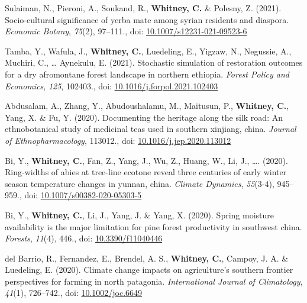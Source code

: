 \documentclass[11pt,a4paper,]{awesome-cv}
\newlength{\cslhangindent}
\newenvironment{CSLReferences}[2] %
 {\begin{list}{}{%
  \setlength{\itemindent}{0pt}
  \setlength{\leftmargin}{0pt}
  \setlength{\parsep}{0pt}
  \ifodd #1
   \setlength{\leftmargin}{\cslhangindent}
   \setlength{\itemindent}{-1\cslhangindent}
  \fi
  \setlength{\itemsep}{#2\baselineskip}}}
 {\end{list}}
\begin{document}
\begin{CSLReferences}{1}{0}
Sulaiman, N., Pieroni, A., Soukand, R., \textbf{Whitney, C.} \& Polesny,
Z. (2021). Socio-cultural significance of yerba mate among syrian
residents and diaspora. \emph{Economic Botany}, \emph{75}(2), 97--111.,
doi:
\href{https://doi.org/10.1007/s12231-021-09523-6}{10.1007/s12231-021-09523-6}

Tamba, Y., Wafula, J., \textbf{Whitney, C.}, Luedeling, E., Yigzaw, N.,
Negussie, A., Muchiri, C., \ldots{} Aynekulu, E. (2021). Stochastic
simulation of restoration outcomes for a dry afromontane forest
landscape in northern ethiopia. \emph{Forest Policy and Economics},
\emph{125}, 102403., doi:
\href{https://doi.org/10.1016/j.forpol.2021.102403}{10.1016/j.forpol.2021.102403}

Abdusalam, A., Zhang, Y., Abudoushalamu, M., Maitusun, P.,
\textbf{Whitney, C.}, Yang, X. \& Fu, Y. (2020). Documenting the
heritage along the silk road: An ethnobotanical study of medicinal teas
used in southern xinjiang, china. \emph{Journal of Ethnopharmacology},
113012., doi:
\href{https://doi.org/10.1016/j.jep.2020.113012}{10.1016/j.jep.2020.113012}

Bi, Y., \textbf{Whitney, C.}, Fan, Z., Yang, J., Wu, Z., Huang, W., Li,
J., \ldots{}. (2020). Ring-widths of abies at tree-line ecotone reveal
three centuries of early winter season temperature changes in yunnan,
china. \emph{Climate Dynamics}, \emph{55}(3-4), 945--959., doi:
\href{https://doi.org/10.1007/s00382-020-05303-5}{10.1007/s00382-020-05303-5}

Bi, Y., \textbf{Whitney, C.}, Li, J., Yang, J. \& Yang, X. (2020).
Spring moisture availability is the major limitation for pine forest
productivity in southwest china. \emph{Forests}, \emph{11}(4), 446.,
doi: \href{https://doi.org/10.3390/f11040446}{10.3390/f11040446}

del Barrio, R., Fernandez, E., Brendel, A. S., \textbf{Whitney, C.},
Campoy, J. A. \& Luedeling, E. (2020). Climate change impacts on
agriculture's southern frontier perspectives for farming in north
patagonia. \emph{International Journal of Climatology}, \emph{41}(1),
726--742., doi:
\href{https://doi.org/10.1002/joc.6649}{10.1002/joc.6649}


\end{CSLReferences}
\end{document}
